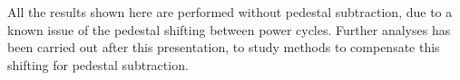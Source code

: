 \documentclass[conference]{IEEEtran}
\begin{document}
All the results shown here are performed without pedestal subtraction, due to a known issue of the pedestal shifting between power cycles.
Further analyses has been carried out after this presentation,
to study methods to compensate this shifting for pedestal subtraction.


%
%



%
%
\end{document}
